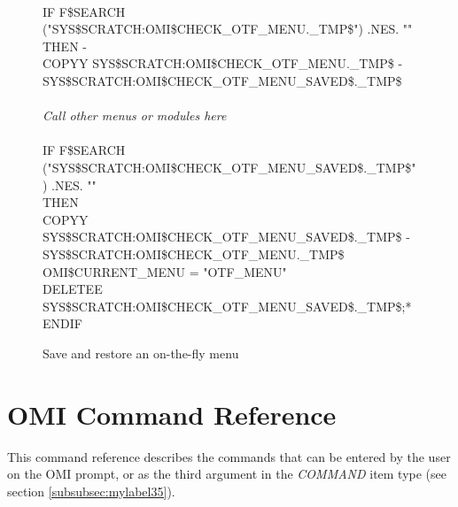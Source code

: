 \documentclass[a4paper]{book}
\renewcommand{\indent}{\hspace*{5mm}}
\begin{document}
\begin{figure}[h!tb]
\begin{minipage}[h!tb]{\textwidth}
\hrulefill \\
\begin{small}
\begin{ttfamily}
\indent{\$} IF F{\$}SEARCH ("SYS{\$}SCRATCH:OMI{\$}CHECK{\_}OTF{\_}MENU.{\_}TMP{\$}") .NES. "" THEN - \\
\indent\indent {\$} COPYY SYS{\$}SCRATCH:OMI{\$}CHECK{\_}OTF{\_}MENU.{\_}TMP{\$} - \\
\indent\indent SYS{\$}SCRATCH:OMI{\$}CHECK{\_}OTF{\_}MENU{\_}SAVED{\$}.{\_}TMP{\$} \\
\vspace{2mm}\\
\textsl{Call other menus or modules here} \\
\vspace{2mm}\\
\indent{\$} IF F{\$}SEARCH ("SYS{\$}SCRATCH:OMI{\$}CHECK{\_}OTF{\_}MENU{\_}SAVED{\$}.{\_}TMP{\$}") .NES. "" \\
\indent{\$} \indent THEN \\
\indent{\$} \indent\indent COPYY SYS{\$}SCRATCH:OMI{\$}CHECK{\_}OTF{\_}MENU{\_}SAVED{\$}.{\_}TMP{\$} - \\
\indent\indent\indent\indent SYS{\$}SCRATCH:OMI{\$}CHECK{\_}OTF{\_}MENU.{\_}TMP{\$} \\
\indent{\$} \indent\indent OMI{\$}CURRENT{\_}MENU = "OTF{\_}MENU" \\
\indent{\$} \indent\indent DELETEE SYS{\$}SCRATCH:OMI{\$}CHECK{\_}OTF{\_}MENU{\_}SAVED{\$}.{\_}TMP{\$};* \\
\indent{\$} ENDIF 
\end{ttfamily}
\end{small}
\caption{Save and restore an on-the-fly menu}\label{fig:otfsavres}
\hrulefill
\end{minipage}
\end{figure}


\chapter{OMI Command Reference}
\label{sec:mylabel1}

This command reference describes the commands that can be entered by the 
user on the OMI prompt, or as the third argument in the \textsl{COMMAND} item 
type (see section \ref{subsubsec:mylabel35}).
\end{document}
